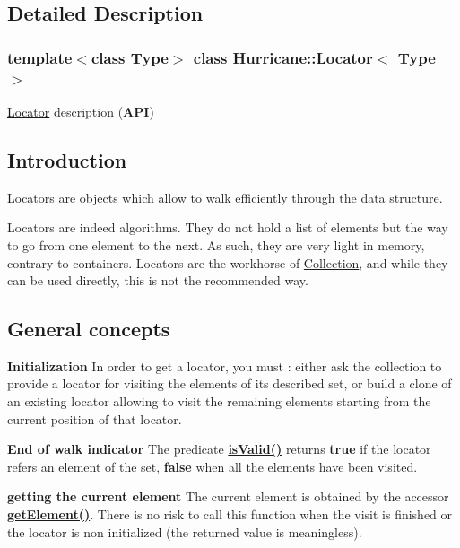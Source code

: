 \subsection{Detailed Description}
\subsubsection*{template$<$class Type$>$\newline
class Hurricane\+::\+Locator$<$ Type $>$}

\mbox{\hyperlink{classHurricane_1_1Locator}{Locator}} description ({\bfseries A\+PI}) 

\hypertarget{classHurricane_1_1Locator_secLocatorIntro}{}\subsection{Introduction}\label{classHurricane_1_1Locator_secLocatorIntro}
Locators are objects which allow to walk efficiently through the data structure.

Locators are indeed algorithms. They do not hold a list of elements but the way to go from one element to the next. As such, they are very light in memory, contrary to containers. Locators are the workhorse of \mbox{\hyperlink{classHurricane_1_1Collection}{Collection}}, and while they can be used directly, this is not the recommended way.\hypertarget{classHurricane_1_1Locator_secLocatorGeneralConcepts}{}\subsection{General concepts}\label{classHurricane_1_1Locator_secLocatorGeneralConcepts}
{\bfseries Initialization} In order to get a locator, you must \+: either ask the collection to provide a locator for visiting the elements of its described set, or build a clone of an existing locator allowing to visit the remaining elements starting from the current position of that locator.

{\bfseries End of walk indicator} The predicate {\bfseries \mbox{\hyperlink{classHurricane_1_1Locator_abb6e5255372e22e31bf0a8e4cae93f87}{is\+Valid()}}} returns {\bfseries true} if the locator refers an element of the set, {\bfseries false} when all the elements have been visited.

{\bfseries getting the current element} The current element is obtained by the accessor {\bfseries \mbox{\hyperlink{classHurricane_1_1Locator_aa2202b4cf461a7c3b666da10bc96219f}{get\+Element()}}}. There is no risk to call this function when the visit is finished or the locator is non initialized (the returned value is meaningless).

